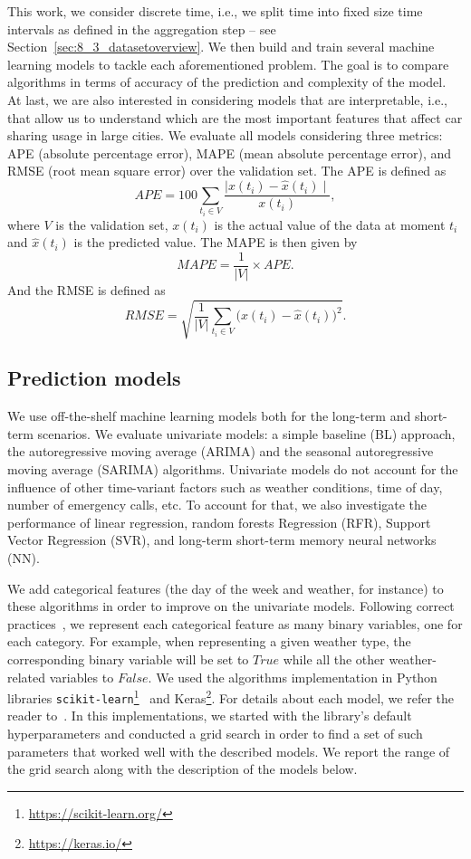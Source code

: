 This work, we consider discrete time, i.e., we split time into fixed size time intervals as defined in the aggregation step -- see Section~\ref{sec:8_3_datasetoverview}. We then build and train several machine learning models to tackle each aforementioned problem. The goal is to compare algorithms in terms of accuracy of the prediction and complexity of the model.
At last, we are also interested in considering models that are interpretable, i.e., that allow us to understand which are the most important features that affect car sharing usage in large cities.
We evaluate all models considering three metrics: APE (absolute percentage error), MAPE (mean absolute percentage error), and RMSE (root mean square error) over the validation set. The APE is defined as
\[
APE=100\sum_{t_i\in V} \frac{\mid x(t_i) - \hat{x}(t_i)\mid}{x(t_i)},
\]
where $V$ is the validation set, $ x(t_i)$ is the actual value of the data at moment $t_i$ and $\hat{x}(t_i)$ is the predicted value. The MAPE is then given by
\[
MAPE=\frac{1}{|V|} \times APE.
\]
And the RMSE is defined as
\[
RMSE = \sqrt{\frac{1}{|V|}\sum_{t_i \in V}{\Big(x(t_i) - \hat{x}(t_i)\Big)^2}}.
\]

\subsection{Prediction models}

We use off-the-shelf machine learning models both for the long-term and short-term scenarios. We evaluate univariate models: a simple baseline (BL) approach, the autoregressive moving average (ARIMA) and the seasonal autoregressive moving average (SARIMA) algorithms. 
Univariate models do not account for the influence of other time-variant factors such as weather conditions, time of day, number of emergency calls, etc. 
To account for that, we also investigate the performance of linear regression, random forests Regression (RFR), Support Vector Regression (SVR), and long-term short-term memory neural networks (NN).

We add categorical features (the day of the week and weather, for instance) to these algorithms in order to improve on the univariate models. Following correct practices~\citep{jain1990art}, we represent each categorical feature as many binary variables, one for each category. For example, when representing a given weather type, the corresponding binary variable will be set to $True$ while all the other weather-related variables to $False$.
We used the algorithms implementation in Python libraries \texttt{scikit-learn}\footnote{\url{https://scikit-learn.org/}}~\citep{scikitlearn} and Keras\footnote{\url{https://keras.io/}}. 
For details about each model, we refer the reader to~\citep{Bishop:2006}. 
In this implementations, we started with the library's default hyperparameters and conducted a grid search in order to find a set of such parameters that worked well with the described models. We report the range of the grid search along with the description of the models below.


